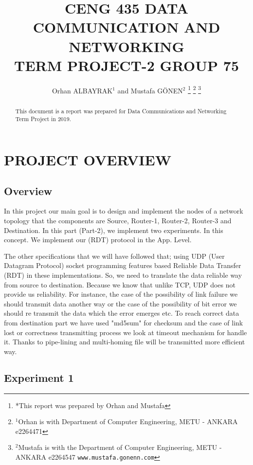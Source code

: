 \documentclass[letterpaper, 12 pt, conference]{ieeeconf}  %
\title{\LARGE \bf
CENG 435 DATA COMMUNICATION AND NETWORKING \\ TERM PROJECT-2 GROUP 75
}
\author{Orhan ALBAYRAK$^{1}$ and Mustafa GÖNEN$^{2}$%
\thanks{*This report was prepared by Orhan and Mustafa}%
\thanks{$^{1}$Orhan is with Department of Computer Engineering, METU - ANKARA e2264471
        {\tt\small}}%
\thanks{$^{2}$Mustafa is with the Department of Computer Engineering, METU - ANKARA e2264547
        {\tt\small www.mustafa.gonenn.com}}%
}
\begin{document}
\maketitle
\thispagestyle{empty}
\pagestyle{empty}


\begin{abstract}

This document is a report was prepared for Data Communications and Networking Term Project in 2019. 

\end{abstract}


\section{PROJECT OVERVIEW}

\subsection{ Overview }

In this project our main goal is to design and implement the nodes of a network topology that the components are Source, Router-1, Router-2, Router-3 and Destination. In this part (Part-2), we implement two experiments. In this concept. We implement our (RDT) protocol in the App. Level. 
\vspace{1cm}

The other specifications that we will have followed that; using UDP (User Datagram Protocol) socket programming features based Reliable Data Transfer (RDT) in these implementations. So, we need to translate the data reliable way from source to destination.  Because we know that unlike TCP, UDP does not provide us reliability. For instance, the case of the possibility of link failure we should transmit data another way or the case of the possibility of bit error we should re transmit the data which the error emerges etc. To reach correct data from destination part we have used "md5sum" for checksum and the case of link lost or correctness transmitting process we look at timeout mechanism for handle it. Thanks to pipe-lining and multi-homing file will be transmitted more efficient way.

\subsection{ Experiment 1 }
\end{document}
